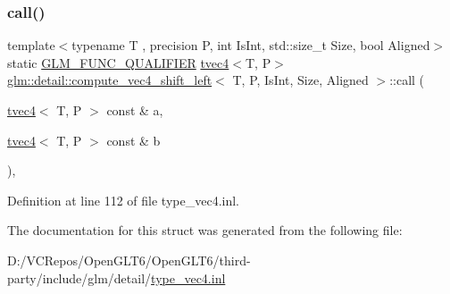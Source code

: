 \subsubsection{\texorpdfstring{call()}{call()}}
{\footnotesize\ttfamily template$<$typename T , precision P, int Is\+Int, std\+::size\+\_\+t Size, bool Aligned$>$ \\
static \mbox{\hyperlink{setup_8hpp_a33fdea6f91c5f834105f7415e2a64407}{G\+L\+M\+\_\+\+F\+U\+N\+C\+\_\+\+Q\+U\+A\+L\+I\+F\+I\+ER}} \mbox{\hyperlink{structglm_1_1tvec4}{tvec4}}$<$T, P$>$ \mbox{\hyperlink{structglm_1_1detail_1_1compute__vec4__shift__left}{glm\+::detail\+::compute\+\_\+vec4\+\_\+shift\+\_\+left}}$<$ T, P, Is\+Int, Size, Aligned $>$\+::call (\begin{DoxyParamCaption}\item[{\mbox{\hyperlink{structglm_1_1tvec4}{tvec4}}$<$ T, P $>$ const \&}]{a,  }\item[{\mbox{\hyperlink{structglm_1_1tvec4}{tvec4}}$<$ T, P $>$ const \&}]{b }\end{DoxyParamCaption})\hspace{0.3cm}{\ttfamily [inline]}, {\ttfamily [static]}}



Definition at line 112 of file type\+\_\+vec4.\+inl.



The documentation for this struct was generated from the following file\+:\begin{DoxyCompactItemize}
\item 
D\+:/\+V\+C\+Repos/\+Open\+G\+L\+T6/\+Open\+G\+L\+T6/third-\/party/include/glm/detail/\mbox{\hyperlink{type__vec4_8inl}{type\+\_\+vec4.\+inl}}\end{DoxyCompactItemize}

